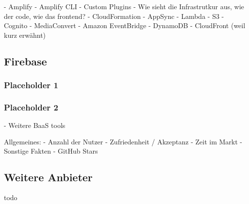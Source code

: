   - Amplify
  - Amplify CLI
  - Custom Plugins
  - Wie sieht die Infrastrutkur aus, wie der code, wie das frontend?
  - CloudFormation
  - AppSync
  - Lambda
  - S3
  - Cognito
  - MediaConvert
  - Amazon EventBridge
  - DynamoDB
  - CloudFront (weil kurz erwähnt)

\subsection{Firebase}

\subsubsection{Placeholder 1}
\subsubsection{Placeholder 2}

\autocite{moroney2017definitive}
\autocite{firebaseDocs}
\autocite{tanna2018serverless}

- Weitere BaaS tools

Allgemeines:
  - Anzahl der Nutzer
  - Zufriedenheit / Akzeptanz
  - Zeit im Markt
  - Sonstige Fakten
  - GitHub Stars

\subsection{Weitere Anbieter}

todo